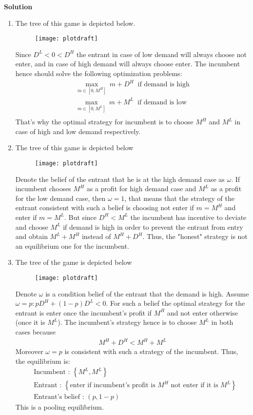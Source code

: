 \documentclass[a4paper]{article}
\begin{document}
\textbf{Solution}
\begin{enumerate}
	\item The tree of this game is depicted below.
		\begin{figure}[H]
		\centering
		\texttt{[image: plotdraft]}
		\caption{}\label{fig1}
	\end{figure}
Since $D^L < 0 < D^H$ the entrant in case of low demand will always choose not enter, and in case of high demand will always choose enter. The incumbent hence should solve the following optimization problems:
\begin{align*}
\underset{m \in [0, M^H]}{\max}\ m+D^H\ \text{ if demand is high}\\
\underset{m \in [0, M^L]}{\max}\ m+M^L\ \text{ if demand is low}\\
\end{align*}
That's why the optimal strategy for incumbent is to choose $M^H$ and $M^L$ in case of high and low demand respectively.
\item The tree of this game is depicted below
		\begin{figure}[H]
	\centering
	\texttt{[image: plotdraft]}
	\caption{}\label{fig2}
\end{figure}
Denote the belief of the entrant that he is at the high demand case as $\omega$. If incumbent chooses $M^H$ as a profit for high demand case and $M^L$ as a profit for the low demand case, then $\omega = 1$, that means that the strategy of the entrant consistent with such a belief is choosing not enter if $m = M^H$ and enter if $m = M^L$. But since $D^H < M^L$ the incumbent has incentive to deviate and choose $M^L$ if demand is high in order to prevent the entrant from entry and obtain $M^L + M^H$ instead of $M^H + D^H$. Thus, the "honest" strategy is not an equilibrium one for the incumbent.
\item The tree of the game is depicted below
\begin{figure}[H]
	\centering
	\texttt{[image: plotdraft]}
	\caption{}\label{fig3}
\end{figure}
Denote $\omega$ is a condition belief of the entrant that the demand is high. Assume $\omega = p: pD^H + (1-p)D^L < 0$. For such a belief the optimal strategy for the entrant is enter once the incumbent's profit if $M^H$ and not enter otherwise (once it is $M^L$). The incumbent's strategy hence is to choose $M^L$ in both cases because
\begin{align*}
M^H + D^H < M^H + M^L
\end{align*}
Moreover $\omega = p$ is consistent with such a strategy of the incumbent. Thus, the equilibrium is:
\begin{align*}
&\text{Incumbent : } \left\{M^L, M^L\right\}\\
&\text{Entrant : } \left\{\text{enter if incumbent's profit is } M^H \text{ not enter if it is } M^L\right\}\\
&\text{Entrant's belief : } (p, 1-p)
\end{align*}
This is a pooling equilibrium.
\end{enumerate}
\end{document}
